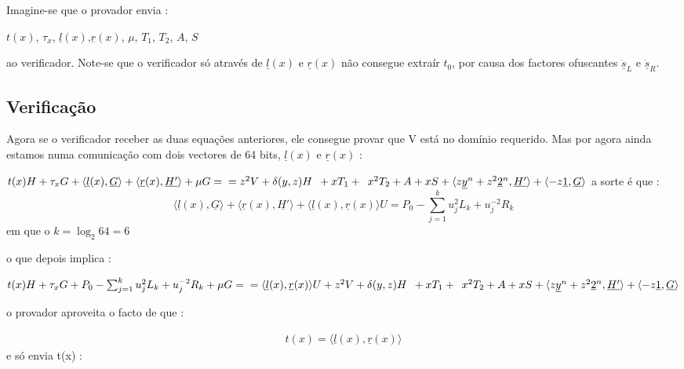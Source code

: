 Imagine-se que o provador envia :

$t(x)$, $\tau_x$, $\underline{l}(x)$,$\underline{r}(x)$, $\mu$, $T_1$, $T_2$, $A$, $S$

ao verificador. Note-se que o verificador só através de $\underline{l}(x)$ e $\underline{r}(x)$ não consegue extraír $t_0$, por causa dos factores ofuscantes $\underline{\dot{s}}_L$ e $\underline{\dot{s}}_R$.  

\subsection{Verificação}
\label{sec:bullet_ver}

Agora se o verificador receber as duas equações anteriores, ele consegue provar que V está no domínio requerido. Mas por agora ainda estamos numa comunicação com dois vectores de 64 bits, $\underline{l}(x)$ e $\underline{r}(x)$ : \newline


$t(x) H + \tau_x G + \langle \underline{l}(x),\underline{G}\rangle + \langle \underline{r}(x),\underline{H'}\rangle + \mu G=\\= z^2 V + \delta(y, z) H \enspace+ x T_1 +\enspace x^2 T_2 + A + x S + \langle z\underline{y}^n + z^2\underline{2}^n,\underline{H'}\rangle + \langle -z\underline{1},\underline{G}\rangle$
\newline\newline
a sorte é que :
\begin{equation}
\langle \underline{l}(x),\underline{G}\rangle + \langle \underline{r}(x),\underline{H'}\rangle + \langle \underline{l}(x), \underline{r}(x)\rangle U = P_0 - \sum_{j=1}^{k} u_{j}^{2}L_k + u_{j}^{-2}R_k
\end{equation}
\newline\hspace*{\fill} em que o $k=\log_{2}64=6$

o que depois implica :

$t(x) H + \tau_x G + P_0 - \sum_{j=1}^{k} u_{j}^{2}L_k + u_{j}^{-2}R_k  + \mu G=\\= \langle \underline{l}(x), \underline{r}(x)\rangle U + z^2 V + \delta(y, z) H \enspace+ x T_1 +\enspace x^2 T_2 + A + x{S} + \langle z\underline{y}^n + z^2\underline{2}^n,\underline{H'}\rangle + \langle -z\underline{1},\underline{G}\rangle$

o provador aproveita o facto de que :

\begin{align*}
t(x) = \langle \underline{l}(x), \underline{r}(x) \rangle
\end{align*}
e só envia t(x) :\newline

